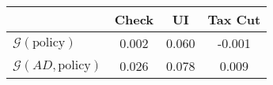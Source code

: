 \begin{tabular}{@{}lccc@{}} 
\toprule 
                          & Check      & UI    & Tax Cut    \\  \midrule 
$\mathcal{G}(\text{policy})$ & 0.002  & 0.060  & -0.001     \\ 
$\mathcal{G}(AD,\text{policy})$ & 0.026  & 0.078  & 0.009     \\ 
\end{tabular}  
